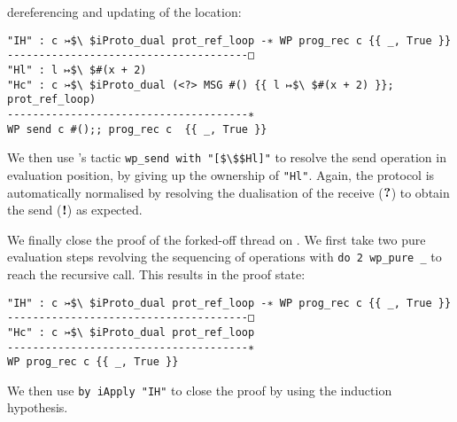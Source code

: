 dereferencing and updating of the location:
\begin{lstlisting}
"IH" : c ↣$\ $iProto_dual prot_ref_loop -∗ WP prog_rec c {{ _, True }}
--------------------------------------□
"Hl" : l ↦$\ $#(x + 2)
"Hc" : c ↣$\ $iProto_dual (<?> MSG #() {{ l ↦$\ $#(x + 2) }}; prot_ref_loop)
--------------------------------------∗
WP send c #();; prog_rec c  {{ _, True }}
\end{lstlisting}
We then use \lname's tactic \lstinline{wp_send with "[$\$$Hl]"} to resolve the
send operation in evaluation
position, by giving up the ownership of \lstinline{"Hl"}.
Again, the protocol is automatically normalised by resolving the dualisation of the receive
($\textnormal{\bf ?}$) to obtain the send ($\textnormal{\bf !}$) as expected.

We finally close the proof of the forked-off thread on .
We first take two pure evaluation steps revolving the sequencing of operations with
\lstinline{do 2 wp_pure _} to reach the recursive call.
This results in the proof state:
\begin{lstlisting}
"IH" : c ↣$\ $iProto_dual prot_ref_loop -∗ WP prog_rec c {{ _, True }}
--------------------------------------□
"Hc" : c ↣$\ $iProto_dual prot_ref_loop
--------------------------------------∗
WP prog_rec c {{ _, True }}
\end{lstlisting}
We then use \lstinline{by iApply "IH"} to close the proof by using the
 induction hypothesis.

